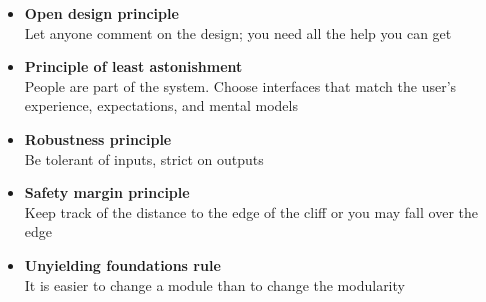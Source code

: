 \begin{itemize}
\item \textbf{Open design principle} \\
  Let anyone comment on the design; you need all the help you can get

\item \textbf{Principle of least astonishment} \\
  People are part of the system. Choose interfaces that match the
  user's experience, expectations, and mental models

\item \textbf{Robustness principle} \\
  Be tolerant of inputs, strict on outputs

\item \textbf{Safety margin principle} \\
  Keep track of the distance to the edge of the cliff or you may fall
  over the edge

\item \textbf{Unyielding foundations rule} \\
  It is easier to change a module than to change the modularity
\end{itemize}

